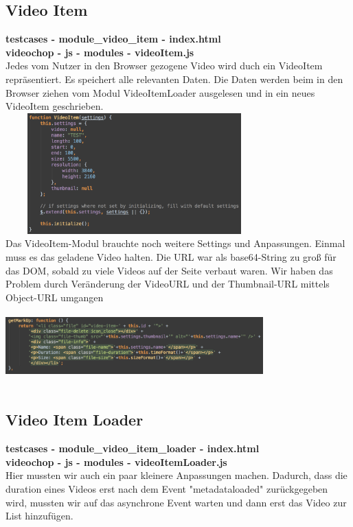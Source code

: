 \documentclass[a4paper,10pt]{scrartcl}
\begin{document}
\subsection{Video Item}
\textbf{testcases - module\_video\_item - index.html} \\
\textbf{videochop - js - modules - videoItem.js} \\
Jedes vom Nutzer in den Browser gezogene Video wird duch ein VideoItem repräsentiert. Es speichert alle relevanten Daten. Die Daten werden beim in den Browser ziehen vom Modul VideoItemLoader ausgelesen und in ein neues VideoItem geschrieben.\\
\includegraphics[height=176px, width=375px]{images/videoitem.png}\\
Das VideoItem-Modul brauchte noch weitere Settings und Anpassungen. Einmal muss es das geladene Video halten. Die URL war als base64-String zu groß für das DOM, sobald zu viele Videos auf der Seite verbaut waren. Wir haben das Problem durch Veränderung der VideoURL und der Thumbnail-URL mittels Object-URL umgangen \\
\includegraphics[height=120px, width=375px]{images/videoitem2.png}\\
\subsection{Video Item Loader}
\textbf{testcases - module\_video\_item\_loader - index.html} \\
\textbf{videochop - js - modules - videoItemLoader.js} \\
Hier mussten wir auch ein paar kleinere Anpassungen machen. Dadurch, dass die duration eines Videos erst nach dem Event "metadataloaded" zurückgegeben wird, mussten wir auf das asynchrone Event warten und dann erst das Video zur List hinzufügen.
\end{document}
